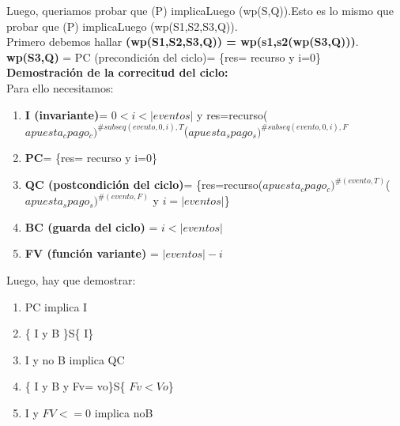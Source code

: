 \documentclass[10pt,a4paper]{article}
\begin{document}
\begin{flushleft}
\vspace{3mm}
Luego, queriamos probar que (P) implicaLuego (wp(S,Q)).Esto es lo mismo que probar que (P) implicaLuego (wp(S1,S2,S3,Q)).\\
\vspace{3mm}
Primero debemos hallar \textbf{(wp(S1,S2,S3,Q)) = wp(s1,s2(wp(S3,Q)))}.\\
\vspace{3mm}
\textbf{wp(S3,Q)} = PC (precondición del ciclo)= \{res= recurso y i=0\}\\
\vspace{3mm}
\textbf{Demostración de la correcitud del ciclo:}\\
\vspace{3mm}
Para ello necesitamos: 
\begin{enumerate} \setlength\itemsep{0cm}
	\item \textbf{I (invariante)}= $0<i<|eventos|$ y res=recurso($apuesta_cpago_c)^{\#subseq(evento,0,i),T}$($apuesta_spago_s)^{\#subseq(evento,0,i),F}$
	\item \textbf{PC}= \{res= recurso y i=0\}
	\item \textbf{QC (postcondición del ciclo)}= \{res=recurso($apuesta_cpago_c)^{\#(evento,T)}$($apuesta_spago_s)^{\#(evento,F)}$ y $i=|eventos|$\}
	\item \textbf{BC (guarda del ciclo)} = $i < |eventos|$
	\item \textbf{FV (función variante)} = $|eventos|-i$
\end{enumerate}

Luego, hay que demostrar:
\begin{enumerate} \setlength\itemsep{0cm}
	\item PC implica I
	\item \{ I y B \}S\{ I\}
	\item I y no B implica QC
	\item \{ I y B  y Fv= vo\}S\{ $Fv<Vo$\}
	\item I y $FV<=0$ implica noB
\end{enumerate}


\end{flushleft}
\end{document}
